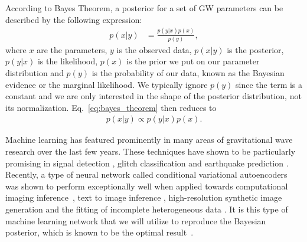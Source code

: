 \documentclass[%
showpacs,
 amsmath,amssymb,
 aps,
 twocolumn,
 prl,
 reprint,
floatfix,
]{revtex4-1}
\begin{document}
%
%
According to Bayes Theorem, a posterior for a set of GW parameters can be
described by the following expression:
%
\begin{align}\label{eq:bayes_theorem}
    p(x|y) &= \frac{p(y|x) p(x)}{p(y)},
\end{align}
%
where $x$ are the parameters, $y$ is the observed data, $p(x|y)$ is the
posterior, $p(y|x)$ is the likelihood, $p(x)$ is the prior we put on our
parameter distribution and $p(y)$ is the probability of our data, known as the
Bayesian evidence or the marginal likelihood. We typically ignore $p(y)$ since
the term is a constant and we are only interested in the shape of the posterior
distribution, not its normalization. Eq.~\ref{eq:bayes_theorem} then reduces
to
%
\begin{align}\label{eq:simplified_bayes} 
p(x|y) \propto p(y|x) p(x).
\end{align} 
   
%
%
Machine learning has featured prominently in many areas of gravitational wave
research over the last few years. These techniques have shown to be
particularly promising in signal detection
\cite{GEORGE201864,PhysRevLett.120.141103,1904.08693}, glitch classification
\cite{1706.07446,0264-9381-34-6-064003} and earthquake prediction
\cite{Coughlin_2017}. Recently, a type of neural network called conditional
variational autoencoders was shown to perform exceptionally well when applied
towards computational imaging inference~\cite{1904.06264,NIPS2015_5775}, text
to image inference \cite{1512.00570}, high-resolution synthetic image
generation \cite{1612.00005} and the fitting of incomplete heterogeneous data
\cite{1807.03653}. It is this type of machine learning network that 
we will utilize to reproduce the Bayesian posterior, which is known to be 
the optimal result~\cite{Searle}.
\end{document}
